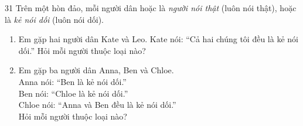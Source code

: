 \documentclass[11pt]{article}
\newenvironment{probbox}[2]{\begin{probboxT}{#1}{#2}}{\end{probboxT}}
\begin{document}
\begin{probbox}{31}{\relax}
Trên một hòn đảo, mỗi người dân hoặc là \emph{người nói thật} (luôn nói thật), hoặc là \emph{kẻ nói dối} (luôn nói dối).
\begin{enumerate}[label=\alph*),leftmargin=1.6em,itemsep=1pt,topsep=2pt]
  \item Em gặp hai người dân Kate và Leo. Kate nói: ``Cả hai chúng tôi đều là kẻ nói dối.'' Hỏi mỗi người thuộc loại nào?
  \item Em gặp ba người dân Anna, Ben và Chloe.\\
  Anna nói: ``Ben là kẻ nói dối.''\\
  Ben nói: ``Chloe là kẻ nói dối.''\\
  Chloe nói: ``Anna và Ben đều là kẻ nói dối.''\\
  Hỏi mỗi người thuộc loại nào?
\end{enumerate}
\end{probbox}
\end{document}
